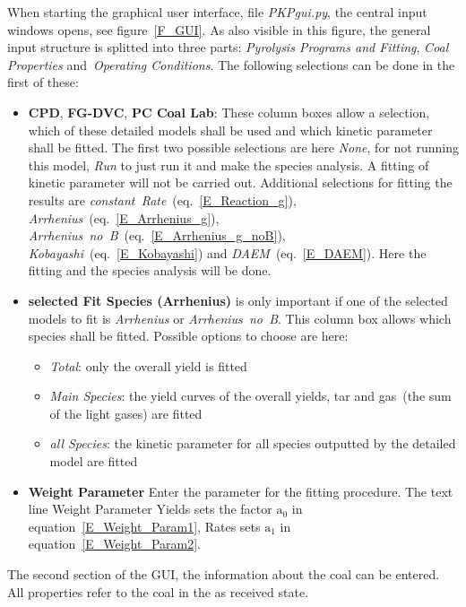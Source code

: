When starting the graphical user interface, file \emph{PKPgui.py}, the central input windows opens, see figure~\ref{F_GUI}.
As also visible in this figure, the general input structure is splitted into three parts: \emph{Pyrolysis Programs and Fitting}, \emph{Coal Properties} and~\emph{Operating Conditions}. The following selections can be done in the first of these:
\begin{itemize}
 \item \textbf{CPD}, \textbf{FG-DVC}, \textbf{PC Coal Lab}: These column boxes allow a selection, which of these detailed models shall be used and which kinetic parameter shall be fitted. The first two possible selections are here \emph{None}, for not running this model, \emph{Run} to just run it and make the species analysis. A fitting of kinetic parameter will not be carried out. Additional selections for fitting the results are \emph{constant~Rate}~(eq.~\ref{E_Reaction_g}), \emph{Arrhenius}~(eq.~\ref{E_Arrhenius_g}), \emph{Arrhenius~no~B}~(eq.~\ref{E_Arrhenius_g_noB}), \emph{Kobayashi}~(eq.~\ref{E_Kobayashi}) and \emph{DAEM}~(eq.~\ref{E_DAEM}). Here the fitting and the species analysis will be done.
 \item \textbf{selected Fit Species (Arrhenius)} is only important if one of the selected models to fit is \emph{Arrhenius} or \emph{Arrhenius~no~B}. This column box allows which species shall be fitted. Possible options to choose are here:
 \begin{itemize}
  \item \emph{Total}: only the overall yield is fitted
  \item \emph{Main Species}: the yield curves of the overall yields, tar and gas~(the sum of the light gases) are fitted
  \item \emph{all Species}: the kinetic parameter for all species outputted by the detailed model are fitted
 \end{itemize}
 \item \textbf{Weight Parameter} Enter the parameter for the fitting procedure. The text line Weight Parameter Yields sets the factor $\mathrm{a_0}$ in equation~\ref{E_Weight_Param1}, Rates sets $\mathrm{a_1}$ in equation~\ref{E_Weight_Param2}.
\end{itemize}
The second section of the GUI, the information about the coal can be entered. All properties refer to the coal in the as received state.
